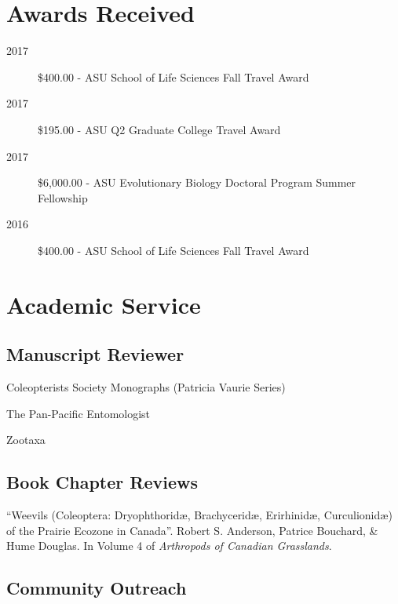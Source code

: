 \documentclass[12pt,a4paper]{article}
\begin{document}
\section*{Awards Received}

	\begin{description}
		\item [2017] \$400.00 - ASU School of Life Sciences Fall Travel Award
		\item [2017] \$195.00 - ASU Q2 Graduate College Travel Award
		\item [2017] \$6,000.00 - ASU Evolutionary Biology Doctoral Program Summer Fellowship
		\item [2016] \$400.00 - ASU School of Life Sciences Fall Travel Award
	\end{description}

\section*{Academic Service}

	\subsection*{Manuscript Reviewer}
	
		\begin{description}
			\item Coleopterists Society Monographs (Patricia Vaurie Series) 
			\item The Pan-Pacific Entomologist 
			\item Zootaxa
		\end{description}

	\subsection*{Book Chapter Reviews}

		\begin{description}
			\item ``Weevils (Coleoptera: Dryophthorid\ae, Brachycerid\ae, Erirhinid\ae, Curculionid\ae) of the Prairie Ecozone in Canada''.
					Robert S. Anderson, Patrice Bouchard, \& Hume Douglas.
					In Volume 4 of \textit{Arthropods of Canadian Grasslands}.
		\end{description}

	\subsection*{Community Outreach} 
\end{document}
